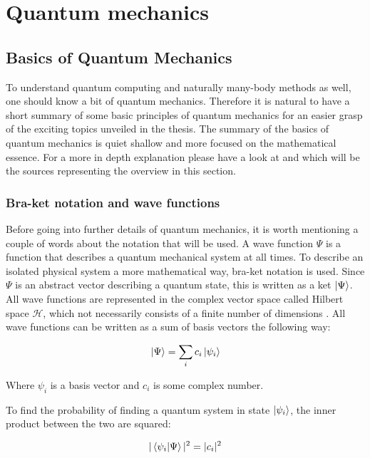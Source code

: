 \documentclass[../main.tex]{subfiles}
\begin{document}
\chapter{Quantum mechanics}
\label{sec:third}
\section{Basics of Quantum Mechanics}
To understand quantum computing and naturally many-body methods as well, one should know a bit of quantum mechanics. Therefore it is natural to have a short summary of some basic principles of quantum mechanics for an easier grasp of the exciting topics unveiled in the thesis. The summary of the basics of quantum mechanics is quiet shallow and more focused on the mathematical essence. For a more in depth explanation please have a look at \cite{griffiths_schroeter_2018} and \cite{10.5555/1972505} which will be the sources representing the overview in this section.

\subsection{Bra-ket notation and wave functions}
Before going into further details of quantum mechanics, it is worth mentioning a couple of words about the notation that will be used. A wave function $\Psi$ is a function that describes a quantum mechanical system at all times. To describe an isolated physical system a more mathematical way, bra-ket notation is used. Since $\Psi$ is an abstract vector describing a quantum state, this is written as a ket $\ket{\Psi}$. 
All wave functions are represented in the complex vector space called Hilbert space $\mathcal{H}$, which not necessarily consists of a finite number of dimensions \cite[ch.~6]{hemmer2005kvantemekanikk}. All wave functions can be written as a sum of basis vectors the following way:

\begin{equation}
    \ket{\Psi}=\sum_i c_i\ket{\psi_i}
    \label{eq:statevector_PSI}
\end{equation}

Where $\psi_i$ is a basis vector and $c_i$ is some complex number.

To find the probability of finding a quantum system in state $\ket{\psi_i}$, the inner product between the two are squared:

\begin{equation*}
    |\bra{\psi_i}\ket{\Psi}|^2=|c_i|^2
\end{equation*}
\end{document}

